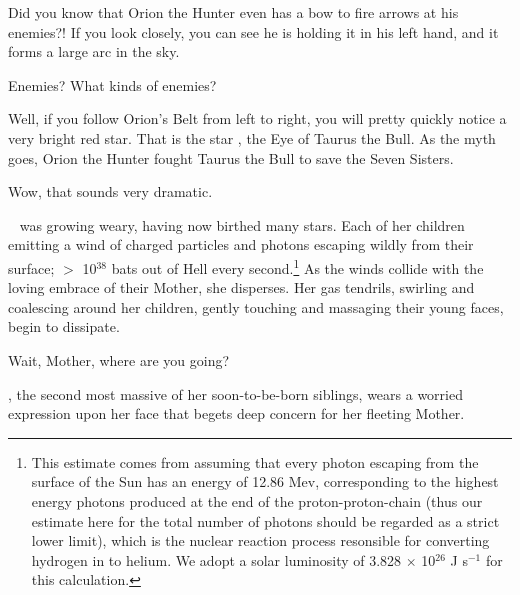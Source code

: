 \documentclass[main.tex]{subfiles}
\begin{document}
\newpara \Pleione Did you know that Orion the Hunter even has a bow to fire arrows at his enemies?!  If you look closely, you can see he is holding it in his left hand, and it forms a large arc in the sky.

\newpara \Maia Enemies?  What kinds of enemies?

\newpara \Pleione Well, if you follow Orion's Belt from left to right, you will pretty quickly notice a very bright red star.  That is the star \rmaldebarran, the Eye of Taurus the Bull.  As the myth goes, Orion the Hunter fought Taurus the Bull to save the Seven Sisters.  

\newpara \Maia Wow, that sounds very dramatic.

\newpara \rmpleione~ was growing weary, having now birthed many stars.  Each of her children emitting a wind of charged particles and photons escaping wildly from their surface; $>$ 10$^{38}$ bats out of Hell every second.\footnote{This estimate comes from assuming that every photon escaping from the surface of the Sun has an energy of 12.86 Mev, corresponding to the highest energy photons produced at the end of the proton-proton-chain (thus our estimate here for the total number of photons should be regarded as a strict lower limit), which is the nuclear reaction process resonsible for converting hydrogen in to helium.  We adopt a solar luminosity of 3.828 $\times$ 10$^{26}$ J s$^{-1}$ for this calculation.}  As the winds collide with the loving embrace of their Mother, she disperses.  Her gas tendrils, swirling and coalescing around her children, gently touching and massaging their young faces, begin to dissipate.

\newpara \Maia Wait, Mother, where are you going?  

\newpara \nar \rmmaia, the second most massive of her soon-to-be-born siblings, wears a worried expression upon her face that begets deep concern for her fleeting Mother.  



\end{document}
